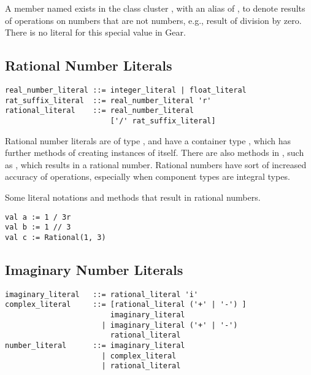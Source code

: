 A member named  exists in the class cluster , with an alias of , to denote results of operations on numbers that are not numbers, e.g., result of division by zero. There is no literal for this special value in Gear. 





\subsection{Rational Number Literals}
\label{sec:rationalliterals}

\syntax\begin{lstlisting}
real_number_literal ::= integer_literal | float_literal
rat_suffix_literal  ::= real_number_literal 'r'
rational_literal    ::= real_number_literal 
                        ['/' rat_suffix_literal]
\end{lstlisting}

Rational number literals are of type , and have a container type , which has further methods of creating instances of itself. There are also methods in , such as \code{//}, which results in a rational number. Rational numbers have sort of increased accuracy of operations, especially when component types are integral types. 

\example Some literal notations and methods that result in rational numbers. 
\begin{lstlisting}
val a := 1 / 3r
val b := 1 // 3
val c := Rational(1, 3)
\end{lstlisting}







\subsection{Imaginary Number Literals}
\label{sec:imaginaryliterals}

\syntax\begin{lstlisting}
imaginary_literal   ::= rational_literal 'i'
complex_literal     ::= [rational_literal ('+' | '-') ]
                        imaginary_literal
	                  | imaginary_literal ('+' | '-') 
	                    rational_literal
number_literal      ::= imaginary_literal
	                  | complex_literal
	                  | rational_literal
\end{lstlisting}

